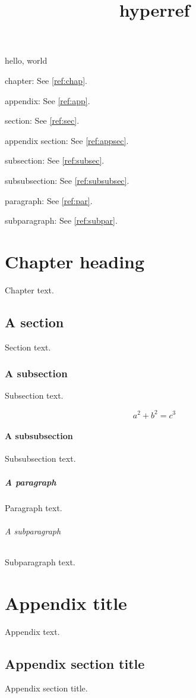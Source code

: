 \documentclass{amsbook}
\title{hyperref}
\begin{document}
hello, world

chapter: See \autoref{ref:chap}.

appendix: See \autoref{ref:app}.

section: See \autoref{ref:sec}.

appendix section: See \autoref{ref:appsec}.

subsection: See \autoref{ref:subsec}.

subsubsection: See \autoref{ref:subsubsec}.

paragraph: See \autoref{ref:par}.

subparagraph: See \autoref{ref:subpar}.

\newpage

\chapter{Chapter heading}
\label{ref:chap}

Chapter text.

\section{A section}
\label{ref:sec}

Section text.

\subsection{A subsection}
\label{ref:subsec}

Subsection text.

\begin{equation}\label{ref:equation}
a^2 + b^2 = c^3
\end{equation}

\subsubsection{A subsubsection}
\label{ref:subsubsec}

Subsubsection text.

\paragraph{A paragraph}
\label{ref:par}

Paragraph text.

\subparagraph{A subparagraph}
\label{ref:subpar}

Subparagraph text.

\appendix

\chapter{Appendix title}
\label{ref:app}

Appendix text.

\section{Appendix section title}
\label{ref:appsec}

Appendix section title.
\end{document}
